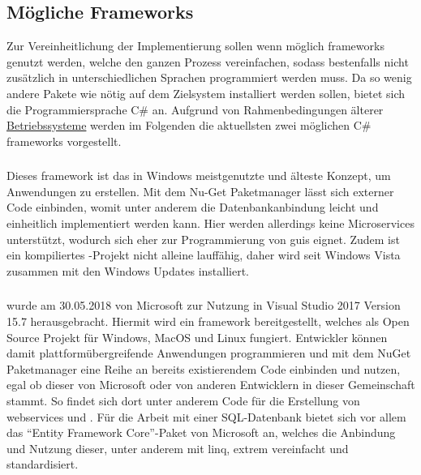 \subsection{Mögliche Frameworks}\label{subsec:moegliche-frameworks}
	Zur Vereinheitlichung der Implementierung sollen wenn möglich \glspl{framework} genutzt werden,
	welche den ganzen Prozess vereinfachen,
	sodass bestenfalls nicht zusätzlich in unterschiedlichen Sprachen programmiert werden muss.
	Da so wenig andere Pakete wie nötig auf dem Zielsystem installiert werden sollen,
	bietet sich die Programmiersprache C\# an.
	Aufgrund von Rahmenbedingungen älterer \hyperref[subsec:betriebssystem]{Betriebssysteme}
	werden im Folgenden die aktuellsten zwei möglichen C\# \glspl{framework} vorgestellt.

	\subsubsection{\netframework}\label{subsubsec:netframework}
		Dieses \gls{framework} ist das in Windows meistgenutzte
		und älteste Konzept,
		um Anwendungen zu erstellen.
		Mit dem Nu-Get Paketmanager lässt sich externer Code einbinden,
		womit unter anderem die Datenbankanbindung leicht und einheitlich implementiert werden kann.
		Hier werden allerdings keine Microservices unterstützt,
		wodurch sich \netframework{} eher zur Programmierung von \glspl{gui} eignet.
		Zudem ist ein kompiliertes \netframework{}-Projekt nicht alleine lauffähig,
		daher wird seit Windows Vista \netframework{} zusammen mit den Windows Updates installiert.

	\subsubsection{\netcore}\label{subsubsec:netcore21}
		\netcore{} wurde am 30.05.2018 von Microsoft zur Nutzung in Visual Studio 2017 Version 15.7 herausgebracht.
		Hiermit wird ein \gls{framework} bereitgestellt,
		welches als Open Source Projekt für Windows,
		MacOS und Linux fungiert.
		Entwickler können damit plattformübergreifende Anwendungen programmieren
		und mit dem NuGet Paketmanager eine Reihe an bereits existierendem Code einbinden und nutzen,
		egal ob dieser von Microsoft oder von anderen Entwicklern in dieser Gemeinschaft stammt.
		So findet sich dort unter anderem Code für die Erstellung von \glspl{webservice}
		und .
		Für die Arbeit mit einer SQL-Datenbank bietet sich vor allem
		das \enquote{Entity Framework Core}-Paket von Microsoft an,
		welches die Anbindung und Nutzung dieser,
		unter anderem mit \gls{linq},
		extrem vereinfacht und standardisiert.

